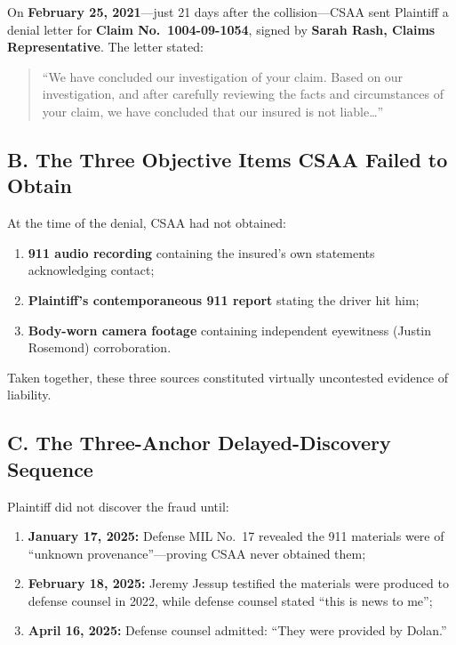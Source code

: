 On \textbf{February 25, 2021}---just 21 days after the collision---CSAA sent Plaintiff a denial letter for \textbf{Claim No.~1004-09-1054}, signed by \textbf{Sarah Rash, Claims Representative}. The letter stated:

\begin{quote}
``We have concluded our investigation of your claim. Based on our investigation, and after carefully reviewing the facts and circumstances of your claim, we have concluded that our insured is not liable\ldots{}''
\end{quote}

\subsection{B. The Three Objective Items CSAA Failed to Obtain}\label{b.-the-three-objective-items-csaa-failed-to-obtain}

At the time of the denial, CSAA had not obtained:

\begin{enumerate}
\def\labelenumi{\arabic{enumi}.}
\tightlist
\item
  \textbf{911 audio recording} containing the insured's own statements acknowledging contact;
\item
  \textbf{Plaintiff's contemporaneous 911 report} stating the driver hit him;
\item
  \textbf{Body-worn camera footage} containing independent eyewitness (Justin Rosemond) corroboration.
\end{enumerate}

Taken together, these three sources constituted virtually uncontested evidence of liability.

\subsection{C. The Three-Anchor Delayed-Discovery Sequence}\label{c.-the-three-anchor-delayed-discovery-sequence}

Plaintiff did not discover the fraud until:

\begin{enumerate}
\def\labelenumi{\arabic{enumi}.}
\tightlist
\item
  \textbf{January 17, 2025:} Defense MIL No.~17 revealed the 911 materials were of ``unknown provenance''---proving CSAA never obtained them;
\item
  \textbf{February 18, 2025:} Jeremy Jessup testified the materials were produced to defense counsel in 2022, while defense counsel stated ``this is news to me'';
\item
  \textbf{April 16, 2025:} Defense counsel admitted: ``They were provided by Dolan.''
\end{enumerate}


